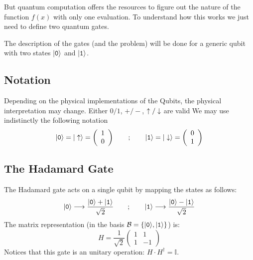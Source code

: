 But quantum computation offers the resources to figure out the nature of the function $f(x)$ with only one evaluation. To understand how this works we just need to define two quantum gates.

The description of the gates (and the problem) will be done for a generic qubit with two states $|\texttt{0}\rangle$ and $|\texttt{1}\rangle$.

\subsection{Notation}
Depending on the physical implementations of the Qubits, the physical interpretation may change. Either $0/1$, $+/-$, $\uparrow/\downarrow$ are valid We may use indistinctly the following notation
\begin{equation}
  |\texttt{0}\rangle = |\uparrow\rangle =
  \left(\begin{array}{c}
        1 \\
        0
        \end{array}\right)
\qquad;\qquad
  |\texttt{1}\rangle = |\downarrow\rangle =
  \left(\begin{array}{c}
        0 \\
        1
        \end{array}\right)
\end{equation}



\subsection{The Hadamard Gate}
The Hadamard gate acts on a single qubit by mapping the states as follows:
\begin{equation}
  |\texttt{0}\rangle \longrightarrow \frac{|\texttt{0}\rangle+|\texttt{1}\rangle}{\sqrt{2}}
  \qquad;\qquad
  |\texttt{1}\rangle \longrightarrow \frac{|\texttt{0}\rangle-|\texttt{1}\rangle}{\sqrt{2}}
\label{Hmap}
\end{equation}
The matrix representation (in the basis $\mathcal{B}=\left\{|\texttt{0}\rangle,|\texttt{1}\rangle\right\}$) is:
\begin{equation}
  H=\frac{1}{\sqrt{2}}\left(\begin{array}{cc}
  1 & 1 \\
  1 & -1
  \end{array}\right)
\label{hadamard}
\end{equation}
Notices that this gate is an unitary operation: $H\cdot H^{\dagger}=\mathbb{I}$.


